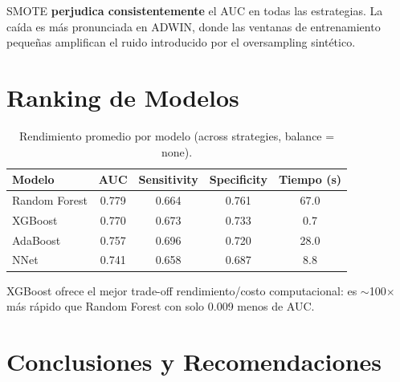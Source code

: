 \documentclass[11pt,a4paper]{article}
\begin{document}
SMOTE \textbf{perjudica consistentemente} el AUC en todas las estrategias. La caída es más pronunciada en ADWIN, donde las ventanas de entrenamiento pequeñas amplifican el ruido introducido por el oversampling sintético.

\section{Ranking de Modelos}

\begin{table}[H]
\centering
\caption{Rendimiento promedio por modelo (across strategies, balance = none).}
\label{tab:modelos}
\begin{tabular}{@{}lS[table-format=1.3]S[table-format=1.3]S[table-format=1.3]S[table-format=3.1]@{}}
\toprule
\textbf{Modelo} & {\textbf{AUC}} & {\textbf{Sensitivity}} & {\textbf{Specificity}} & {\textbf{Tiempo (s)}} \\
\midrule
{}
Random Forest & 0.779 & 0.664 & 0.761 & 67.0 \\
XGBoost       & 0.770 & 0.673 & 0.733 & 0.7 \\
AdaBoost      & 0.757 & 0.696 & 0.720 & 28.0 \\
NNet          & 0.741 & 0.658 & 0.687 & 8.8 \\
\bottomrule
\end{tabular}
\end{table}

XGBoost ofrece el mejor trade-off rendimiento/costo computacional: es $\sim$100$\times$ más rápido que Random Forest con solo 0.009 menos de AUC.

\section{Conclusiones y Recomendaciones}
\end{document}
